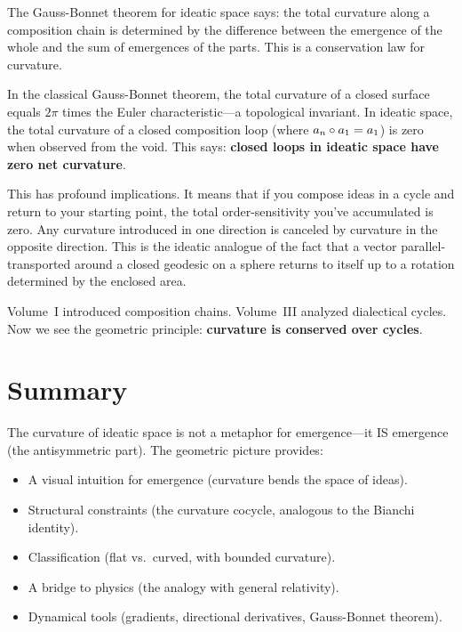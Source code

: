 \begin{interpretation}
The Gauss-Bonnet theorem for ideatic space says: the total curvature along a
composition chain is determined by the difference between the emergence of
the whole and the sum of emergences of the parts. This is a conservation law
for curvature.

In the classical Gauss-Bonnet theorem, the total curvature of a closed surface
equals $2\pi$ times the Euler characteristic---a topological invariant. In
ideatic space, the total curvature of a closed composition loop (where $a_n
\circ a_1 = a_1$) is zero when observed from the void. This says:
\textbf{closed loops in ideatic space have zero net curvature}.

This has profound implications. It means that if you compose ideas in a cycle
and return to your starting point, the total order-sensitivity you've
accumulated is zero. Any curvature introduced in one direction is canceled by
curvature in the opposite direction. This is the ideatic analogue of the fact
that a vector parallel-transported around a closed geodesic on a sphere
returns to itself up to a rotation determined by the enclosed area.

Volume~I introduced composition chains. Volume~III analyzed dialectical
cycles. Now we see the geometric principle: \textbf{curvature is conserved
over cycles}.
\end{interpretation}


\section{Summary}

The curvature of ideatic space is not a metaphor for emergence---it IS emergence
(the antisymmetric part). The geometric picture provides:

\begin{itemize}
  \item A visual intuition for emergence (curvature bends the space of ideas).
  \item Structural constraints (the curvature cocycle, analogous to the Bianchi
    identity).
  \item Classification (flat vs.\ curved, with bounded curvature).
  \item A bridge to physics (the analogy with general relativity).
  \item Dynamical tools (gradients, directional derivatives, Gauss-Bonnet theorem).
\end{itemize}

